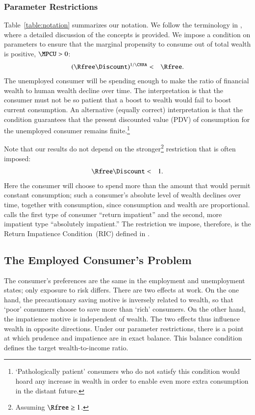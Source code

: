 \documentclass[titlepage,abstract]{\econtex}\newcommand{\texname}{ctDiscrete}
\begin{document}
\subsubsection{Parameter Restrictions\label{sec:params1}}
Table~\ref{table:notation} summarizes our notation. We follow the terminology in \cite{BufferStockTheory}, where a detailed discussion of the concepts is provided. 
We impose a condition on parameters to ensure that the marginal propensity to consume out of total wealth is positive, $\MPCU>0$:
\begin{eqnarray}
(\Rfree \Discount)^{1/\CRRA} & < & \Rfree.
\label{eq:RIC}
\end{eqnarray}
The unemployed consumer will be spending enough to make the ratio of financial wealth to human wealth decline over time. The interpretation is that the consumer must not be so patient that a boost to wealth would fail to boost current consumption. An alternative (equally correct) interpretation is that the condition guarantees that the present discounted value (PDV) of consumption for the unemployed consumer remains finite.\footnote{`Pathologically patient' consumers who do not satisfy this condition would hoard any increase in wealth in order to enable even more extra consumption in the distant future.}  

Note that our results do not depend on the stronger\footnote{Assuming $\Rfree \geq 1$.} restriction that is often imposed:
\begin{eqnarray}
\Rfree \Discount & < & 1.
\label{eq:ImPat}
\end{eqnarray}
Here the consumer will choose to spend more than the amount that would permit constant consumption; such a consumer's absolute level of wealth declines over time, together with consumption, since consumption and wealth are proportional. \cite{BufferStockTheory} calls the first type of consumer ``return impatient'' and the second, more impatient type ``absolutely impatient.'' The restriction we impose, therefore, is the Return Impatience Condition~(RIC) defined in \cite{carrollBSTheory}.



\subsection{The Employed Consumer's Problem}
The consumer's preferences are the same in the employment and unemployment states; only exposure to risk differs.
There are two effects at work. On the one hand, the precautionary saving motive is inversely related to wealth, so that `poor' consumers choose to save more than `rich' consumers. On the other hand, the impatience motive is independent of wealth. The two effects thus influence wealth in opposite directions. Under our parameter restrictions, there is a point at which prudence and impatience are in exact balance. This balance condition defines the target wealth-to-income ratio.
\end{document}
